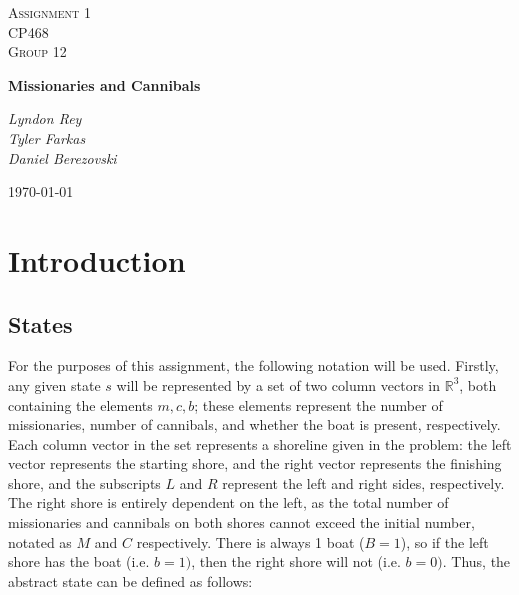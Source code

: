 \documentclass[11pt]{article}
\begin{document}
\begin{titlepage}
	\centering
	{\scshape\Large Assignment 1\\CP468\\Group 12\par}
	\vspace{1.5cm}
	{\huge\bfseries Missionaries and Cannibals\par}
	\vspace{2cm}
	{\Large\itshape Lyndon Rey\\
		Tyler Farkas\\
		Daniel Berezovski \par}

	\vfill

	{\large \today\par}
\end{titlepage}
\section{Introduction}
\subsection{States}
For the purposes of this assignment, the following notation will be used. Firstly, any given state \(s\) will be represented by a set of two column vectors in \(\mathbb{R}^3\), both containing the elements \(m, c, b\); these elements represent the number of missionaries, number of cannibals, and whether the boat is present, respectively. Each column vector in the set represents a shoreline given in the problem: the left vector represents the starting shore, and the right vector represents the finishing shore, and the subscripts \(L\) and \(R\) represent the left and right sides, respectively. The right shore is entirely dependent on the left, as the total number of missionaries and cannibals on both shores cannot exceed the initial number, notated as \(M\) and \(C\) respectively. There is always 1 boat (\(B=1\)), so if the left shore has the boat (i.e. \(b=1)\), then the right shore will not (i.e. \(b=0)\). Thus, the abstract state can be defined as follows:
 
\end{document}
